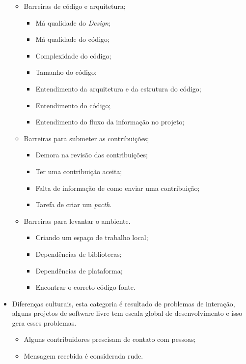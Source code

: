 \begin{itemize}
	\begin{itemize}
	\item Barreiras de código e arquitetura;
		\begin{itemize}
		\item Má qualidade do \textit{Design};
		\item Má qualidade do código;
		\item Complexidade do código;
		\item Tamanho do código;
		\item Entendimento da arquitetura e da estrutura do código;
		\item Entendimento do código;
		\item Entendimento do fluxo da informação no projeto;
		\end{itemize}
	\item Barreiras para submeter as contribuições;
		\begin{itemize}
		\item Demora na revisão das contribuições;
		\item Ter uma contribuição aceita;
		\item Falta de informação de como enviar uma contribuição;
		\item Tarefa de criar um \textit{pacth}.
		\end{itemize}
	\item Barreiras para levantar o ambiente.
		\begin{itemize}
		\item Criando um espaço de trabalho local;
		\item Dependências de bibliotecas;
		\item Dependências de plataforma;
		\item Encontrar o correto código fonte.
		\end{itemize}
	\end{itemize}

\item Diferenças culturais, esta categoria é resultado de problemas de interação, 
alguns projetos de software livre tem escala global de desenvolvimento e isso
gera esses problemas.
	\begin{itemize}
	\item Alguns contribuidores prescisam de contato com pessoas;
	\item Mensagem recebida é considerada rude.
	\end{itemize}
	
\end{itemize}

